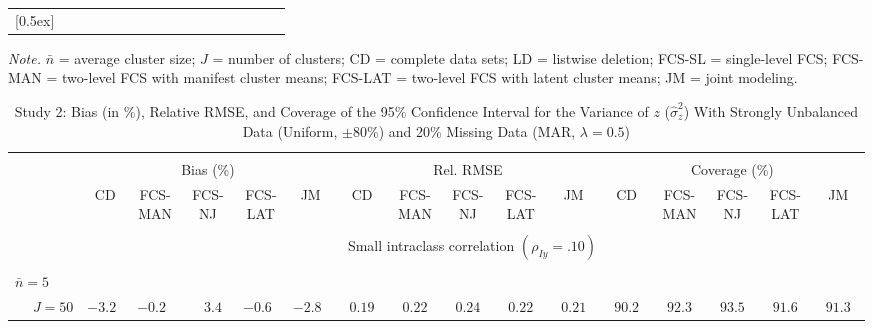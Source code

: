 \begin{sidewaystable}
\begin{threeparttable}
\begin{tabular}{llccccccccccccccc}
[0.5ex]\hline\\[-1.6ex] 
\end{tabular}
\begin{tablenotes}{\footnotesize \textit{Note.} $\bar{n}$ = average cluster size; $J$ = number of clusters; CD = complete data sets; LD = listwise deletion; FCS-SL = single-level FCS; FCS-MAN = two-level FCS with manifest cluster means; FCS-LAT = two-level FCS with latent cluster means; JM = joint modeling.}\end{tablenotes}
\end{threeparttable}
\end{sidewaystable}
\begin{sidewaystable}
\begin{threeparttable}
\setlength{\tabcolsep}{1.0pt}
\renewcommand{\arraystretch}{0.95}
\footnotesize
\caption{\small Study 2: Bias (in \%), Relative RMSE, and Coverage of the 95\% Confidence Interval for the Variance of $z$ ($\hat\sigma_z^2$) With Strongly Unbalanced Data (Uniform, $\pm 80\%$) and 20\% Missing Data (MAR, $\lambda=0.5$)}
\begin{tabular}{llccccccccccccccc}
\hline\\[-1.8ex]
& & \multicolumn{5}{c}{Bias (\%)} & \multicolumn{5}{c}{Rel. RMSE} & \multicolumn{5}{c}{Coverage (\%)} \\ \cmidrule(r){3-7}\cmidrule(r){8-12}\cmidrule(r){13-17}
 &  & CD & \makecell{FCS-\\MAN} & \makecell{FCS-\\NJ} & \makecell{FCS-\\LAT} & JM & CD & \makecell{FCS-\\MAN} & \makecell{FCS-\\NJ} & \makecell{FCS-\\LAT} & JM & CD & \makecell{FCS-\\MAN} & \makecell{FCS-\\NJ} & \makecell{FCS-\\LAT} & \multicolumn{1}{c}{JM} \\ 
[0.4ex]\hline\\[-1.8ex]
& & \multicolumn{15}{c}{Small intraclass correlation $(\rho_{Iy}=.10)$} \\[0.6ex]\hline\\[-1.8ex]
\multicolumn{4}{l}{$\bar{n}=5$} \\  & \nopagebreak $\;J=50$  & ${-}3.2\phantom{0}$ & ${-}0.2\phantom{0}$ & $\phantom{-}3.4\phantom{0}$ & ${-}0.6\phantom{0}$ & ${-}2.8\phantom{0}$ & $\phantom{0}0.19\phantom{0}$ & $\phantom{0}0.22\phantom{0}$ & $\phantom{0}0.24\phantom{0}$ & $\phantom{0}0.22\phantom{0}$ & $\phantom{0}0.21\phantom{0}$ & $\phantom{0}90.2\phantom{0}$ & $\phantom{0}92.3\phantom{0}$ & $\phantom{0}93.5\phantom{0}$ & $\phantom{0}91.6\phantom{0}$ & $\phantom{0}91.3\phantom{0}$ \\

\end{tabular}
\end{threeparttable}
\end{sidewaystable}
